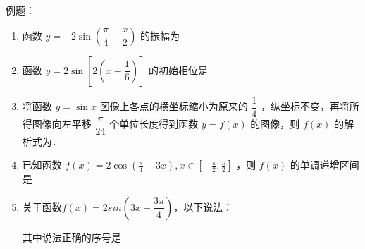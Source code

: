 例题：
\begin{enumerate}
    \item 函数 $y=-2 \sin \left(\dfrac{\pi}{4}-\dfrac{x}{2}\right)$ 的振幅为
    
    
    \item 函数 $y=2 \sin \left[2\left(x+\dfrac{1}{6}\right)\right]$ 的初始相位是
    
    
    \item 将函数 $y=\sin x$ 图像上各点的横坐标缩小为原来的 $\dfrac{1}{4}$ ，纵坐标不变，再将所得图像向左平移 $\dfrac{\pi}{24}$ 个单位长度得到函数 $y=f(x)$ 的图像，则 $f(x)$ 的解析式为．
    
    \item 已知函数 $f(x)=2 \cos \left(\frac{\pi}{4}-3 x\right), x \in\left[-\frac{\pi}{2}, \frac{\pi}{2}\right]$ ，则 $f(x)$ 的单调递增区间是
    
    \item 关于函数$f(x) = 2sin\left(3x - \dfrac{3\pi}{4}\right)$，以下说法：
     其中说法正确的序号是


\end{enumerate}
